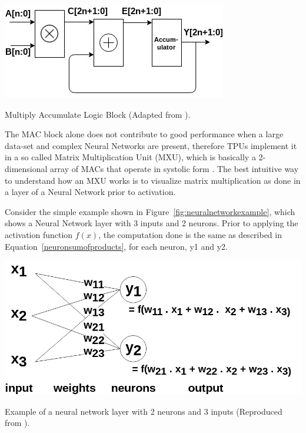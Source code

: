 \begin{marginfigure}
  \includegraphics{graphics/tensor_processing_unit/tensor_processing_unit_mac.jpg}
  \caption{
    Multiply Accumulate Logic Block (Adapted from \citep{paquin}).
  }
  \label{fig:mac}
\end{marginfigure}

The MAC block alone does not contribute to good performance when a large data-set and complex Neural Networks are present, therefore TPUs implement it in a so called Matrix Multiplication Unit (MXU), which is basically a 2-dimensional array of MACs that operate in systolic form \citep{paquin}. The best intuitive way to understand how an MXU works is to visualize matrix multiplication as done in a layer of a Neural Network prior to activation.

Consider the simple example shown in Figure~\ref{fig:neuralnetworkexample}, which shows a Neural Network layer with 3 inputs and 2 neurons. Prior to applying the activation function $f(x)$, the computation done is the same as described in Equation~\ref{neuronsumofproducts}, for each neuron, y1 and y2. 

\begin{marginfigure}
  \includegraphics{graphics/tensor_processing_unit/tensor_processing_unit_nn.jpg}
  \caption{
    Example of a neural network layer with 2 neurons and 3 inputs (Reproduced from \citep{sato}).
  }
  \label{fig:neuralnetworkexample}
\end{marginfigure}

